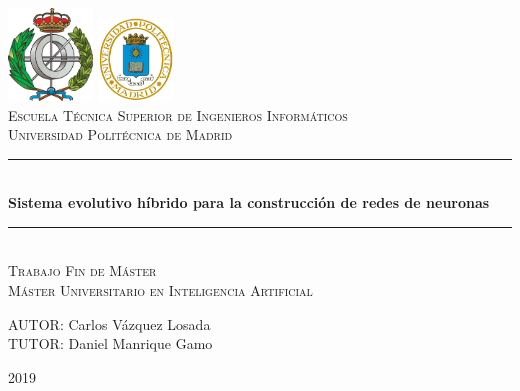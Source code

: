 \begin{titlepage}

\newcommand{\HRule}{\rule{\linewidth}{0.5mm}} %

\center %
 
\includegraphics[width=2.25cm]{recursos/FACINFO}
  \hspace{8cm}
\includegraphics[width=2cm]{recursos/logoupm.png}
\\[1cm]

\textsc{\Large Escuela Técnica Superior de Ingenieros Informáticos}\\[0.5cm]
\textsc{\large Universidad Politécnica de Madrid}
\\[3cm]


 \HRule \\[0.4cm]
{ \huge \bfseries Sistema evolutivo híbrido para la construcción de redes de neuronas} %
\HRule \\[3cm]

\textsc{\LARGE Trabajo Fin de Máster}\\[0.5cm] 
\textsc{\Large Máster Universitario en Inteligencia Artificial }\\[2.5cm]

\begin{flushright}
\large
AUTOR: Carlos Vázquez Losada\\ %
TUTOR: Daniel Manrique Gamo%
\end{flushright}

\vspace{2cm}

{ {2019}}\\[3cm] %

\vfill %

\end{titlepage}